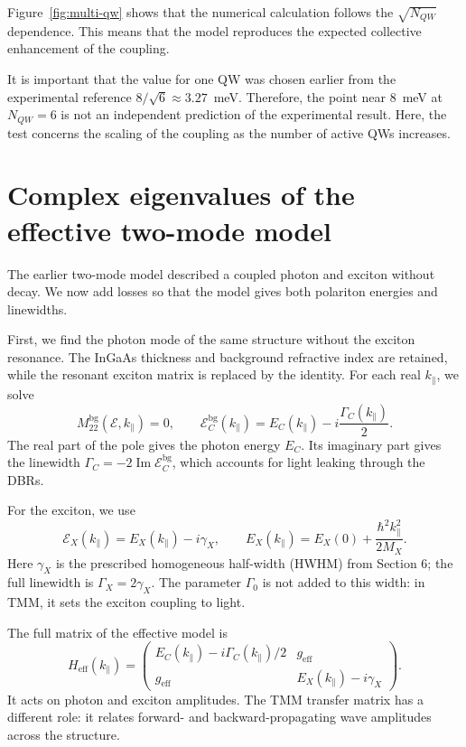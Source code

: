 \documentclass[12pt,a4paper]{article}
\begin{document}
Figure~\ref{fig:multi-qw} shows that the numerical calculation follows the $\sqrt{N_{QW}}$ dependence. This means that the model reproduces the expected collective enhancement of the coupling.

It is important that the value for one QW was chosen earlier from the experimental reference $8/\sqrt{6}\approx3.27$~meV. Therefore, the point near $8$~meV at $N_{QW}=6$ is not an independent prediction of the experimental result. Here, the test concerns the scaling of the coupling as the number of active QWs increases.


\clearpage
\section{Complex eigenvalues of the effective two-mode model}\label{sec:complex-effective}

The earlier two-mode model described a coupled photon and exciton without decay. We now add losses so that the model gives both polariton energies and linewidths.

First, we find the photon mode of the same structure without the exciton resonance. The InGaAs thickness and background refractive index are retained, while the resonant exciton matrix is replaced by the identity. For each real $k_\parallel$, we solve
\[
M_{22}^{\mathrm{bg}}(\mathcal E,k_\parallel)=0,
\qquad
\mathcal E_C^{\mathrm{bg}}(k_\parallel)
=E_C(k_\parallel)-i\frac{\Gamma_C(k_\parallel)}{2}.
\]
The real part of the pole gives the photon energy $E_C$. Its imaginary part gives the linewidth $\Gamma_C=-2\operatorname{Im}\mathcal E_C^{\mathrm{bg}}$, which accounts for light leaking through the DBRs.

For the exciton, we use
\[
\mathcal E_X(k_\parallel)=E_X(k_\parallel)-i\gamma_X,
\qquad
E_X(k_\parallel)=E_X(0)+\frac{\hbar^2k_\parallel^2}{2M_X}.
\]
Here $\gamma_X$ is the prescribed homogeneous half-width (HWHM) from Section 6; the full linewidth is $\Gamma_X=2\gamma_X$. The parameter $\Gamma_0$ is not added to this width: in TMM, it sets the exciton coupling to light.

The full matrix of the effective model is
\[
H_{\mathrm{eff}}(k_\parallel)=
\begin{pmatrix}
E_C(k_\parallel)-i\Gamma_C(k_\parallel)/2 & g_{\mathrm{eff}}\\
g_{\mathrm{eff}} & E_X(k_\parallel)-i\gamma_X
\end{pmatrix}.
\]
It acts on photon and exciton amplitudes. The TMM transfer matrix has a different role: it relates forward- and backward-propagating wave amplitudes across the structure.
\end{document}
